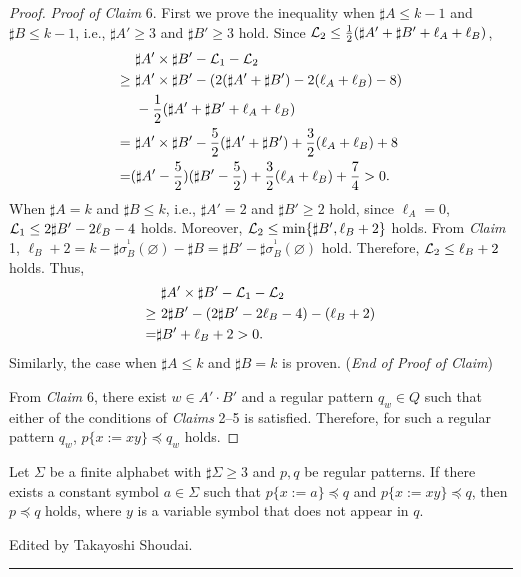 \begin{proof}
\noindent
\textit{Proof of Claim} 6. 
First we prove the inequality when $\sharp A \leq k - 1$ and $\sharp B \leq k - 1$, i.e., $\sharp A' \geq 3$ and $\sharp B' \geq 3$ hold.
Since ${\cal L}_{2} \leq \frac{1}{2}(\sharp A' + \sharp B' + \ell_{A} + \ell_{B})$,
\begin{align*}
  &\ \sharp A' \times \sharp B' - {\cal L}_{1} - {\cal L}_{2}\\
\geq &\ \sharp A' \times \sharp B' - (2(\sharp A' + \sharp B') - 2(\ell_{A} + \ell_{B}) - 8)\\
  &\ - \frac{1}{2}(\sharp A' + \sharp B' + \ell_{A} + \ell_{B})\\
=    &\ \sharp A' \times \sharp B' - \frac{5}{2}(\sharp A' + \sharp B') + \frac{3}{2}(\ell_{A} + \ell_{B}) + 8\\
=    &(\sharp A' - \frac{5}{2})(\sharp B' - \frac{5}{2}) + \frac{3}{2}(\ell_{A} + \ell_{B}) + \frac{7}{4} > 0.
\end{align*}
When $\sharp A = k$ and $\sharp B \leq k$, i.e., $\sharp A' = 2$ and $\sharp B' \geq 2$ hold, since $\ell_{A} = 0$,
${\cal L}_{1} \leq 2\sharp B' - 2\ell_{B} -4$ holds.
Moreover, ${\cal L}_{2} \leq \min\{\sharp B', \ell_{B} + 2\}$ holds.
From \textit{Claim} 1, $\ell_B + 2 = k - \sharp\sigma^{^1}_{B}(\varnothing) - \sharp B = \sharp B' - \sharp\sigma^{^1}_{B}(\varnothing)$ hold. Therefore, ${\cal L}_{2} \leq \ell_{B} + 2$ holds.
Thus,
\begin{align*}
  &\ \sharp A' \times \sharp B' - {\cal L}_{1} - {\cal L}_{2}\\
\geq &\ 2\sharp B' - (2\sharp B' - 2\ell_{B} -4) - (\ell_{B} + 2)\\
= & \sharp B' + \ell_B + 2 > 0.
\end{align*}
Similarly, the case when $\sharp A \leq k$ and $\sharp B = k$ is proven.
(\textit{End of Proof of Claim})

\smallskip

From \textit{Claim} 6, there exist $w\in A'\cdot B'$ and a regular pattern $q_{w} \in Q$ such that either of the conditions of \textit{Claims} 2--5 is satisfied. 
Therefore, for such a regular pattern $q_{w}$, $p \{x := xy\} \preceq q_{w}$ holds.
\end{proof}

\begin{lem}\label{補題15}
Let $\Sigma$ be a finite alphabet with $\sharp \Sigma \ge 3$ and $p,q$ be regular patterns.
If there exists a constant symbol $a \in \Sigma$ such that $p \{ x := a \} \preceq q$ and $p \{ x := xy \} \preceq q$, then $p \preceq q$ holds, where $y$ is a variable symbol that does not appear in $q$.
\end{lem}

\hfill Edited by Takayoshi Shoudai.
\hrule
\bigskip

%
